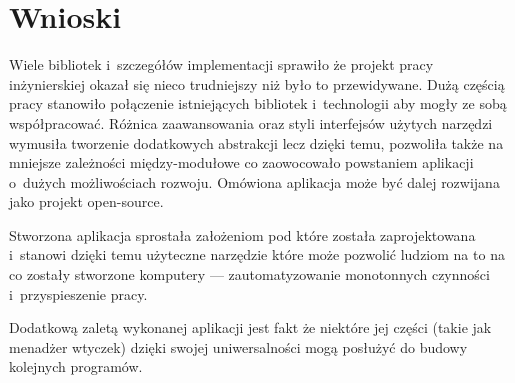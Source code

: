 \chapter{Wnioski}
\label{wnioski}

\par
Wiele bibliotek i~szczegółów implementacji sprawiło że projekt pracy inżynierskiej okazał się nieco trudniejszy niż było to przewidywane.
Dużą częścią pracy stanowiło połączenie istniejących bibliotek i~technologii aby mogły ze sobą współpracować. Różnica zaawansowania oraz styli interfejsów użytych narzędzi wymusiła tworzenie dodatkowych abstrakcji lecz dzięki temu, pozwoliła także na mniejsze zależności między-modułowe co zaowocowało powstaniem aplikacji o~dużych możliwościach rozwoju. Omówiona aplikacja może być dalej rozwijana jako projekt open-source.

\par
Stworzona aplikacja sprostała założeniom pod które została zaprojektowana i~stanowi dzięki temu użyteczne narzędzie które może pozwolić ludziom na to na co zostały stworzone komputery --- zautomatyzowanie monotonnych czynności i~przyspieszenie pracy.

\par
Dodatkową zaletą wykonanej aplikacji jest fakt że niektóre jej części (takie jak menadżer wtyczek) dzięki swojej uniwersalności mogą posłużyć do budowy kolejnych programów.
